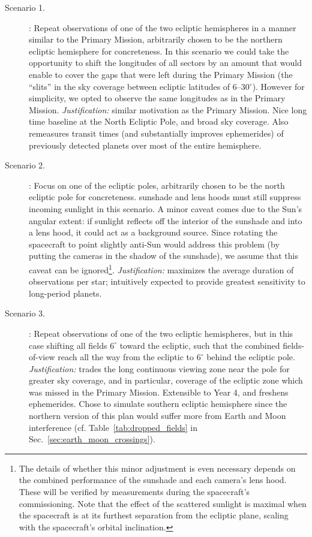 \begin{description}

\item[Scenario 1.] \nhemi: Repeat observations of one of the two
  ecliptic hemispheres in a manner similar to the Primary Mission,
  arbitrarily chosen to be the northern ecliptic hemisphere for
  concreteness. In this scenario we could take the opportunity to 
  shift the longitudes of all sectors by an amount that would enable 
  \tess to cover the gaps that were left during the Primary Mission 
  (the ``slits'' in the sky coverage between ecliptic latitudes of 
  6--30$^\circ$).
  However for simplicity, we opted to observe the same longitudes as
  in the Primary Mission.
  \textit{Justification:} similar motivation as the Primary Mission.
  Nice long time baseline at the North Ecliptic Pole, and broad sky
  coverage. Also remeasures transit times (and substantially improves 
  ephemerides)
  of previously detected \tess planets over most of the entire
  hemisphere.

\item[Scenario 2.] \npole: Focus on one of the ecliptic poles,
	arbitrarily chosen to be the north ecliptic pole for
	concreteness. \tesss sunshade and lens hoods must still
	suppress incoming sunlight in this scenario.
	A minor caveat comes due to the Sun's angular extent:
	if sunlight reflects off the interior of the sunshade and into a lens hood, 
	it could act as a background source.
	Since rotating the spacecraft to point slightly anti-Sun would address this 
	problem (by putting the cameras in the shadow of the sunshade), we assume 
	that 
	this caveat can be ignored\footnote{The details of whether this minor 
	adjustment is even necessary depends on the combined performance of the
		sunshade and each camera's lens hood.
		These will be verified by measurements during the spacecraft's 
		commissioning. Note that the effect of the scattered sunlight is 
		maximal when the spacecraft is 
		at its furthest separation from the ecliptic plane, scaling with the 
		spacecraft's orbital inclination.}.
	\textit{Justification:} maximizes the average duration of
	observations per star; intuitively expected to provide
	greatest sensitivity to long-period planets.

\item[Scenario 3.] \shemiAvoid: Repeat observations of one of the two
  ecliptic hemispheres, but in this case shifting all fields $6^\circ$
  toward the ecliptic, such that the combined fields-of-view reach all
  the way from the ecliptic to $6^\circ$ behind the ecliptic pole.
  \textit{Justification:} trades the long continuous viewing zone near
  the pole for greater sky coverage, and in particular, coverage of
  the ecliptic zone which was missed in the Primary Mission. Extensible
  to Year 4, and freshens ephemerides. Chose
  to simulate southern ecliptic hemisphere since the northern
  version of this plan would suffer more from Earth and Moon interference
  (cf. Table~\ref{tab:dropped_fields} in
  Sec.~\ref{sec:earth_moon_crossings}).
  

\end{description}
